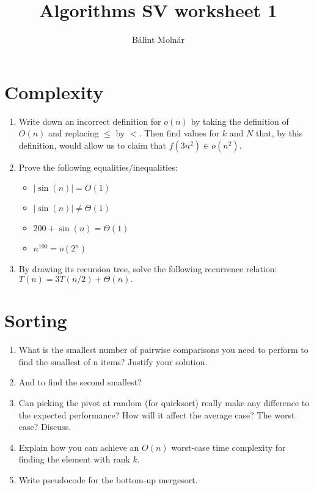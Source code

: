 \documentclass{article}
\title{{Algorithms SV worksheet 1}}
\author{Bálint Molnár}
\begin{document}
\maketitle


\section{Complexity}

\begin{enumerate}
    \item Write down an incorrect definition for $o(n)$ by taking the definition of $O(n)$ and
replacing $\leq$ by $<$. Then find values for $k$ and $N$ that, by this definition, would
allow us to claim that $f (3n^2) \in o(n^2)$.

\item 
Prove the following equalities/inequalities:
\begin{itemize}
    \item $| \sin(n)| = O(1)$
    \item $| \sin(n)| \neq  \Theta(1)$
    \item $ 200 + \sin(n) =  \Theta(1)$
    \item $n^{100} = o(2^n)$
\end{itemize}
\item 
By drawing its recursion tree, solve the following recurrence relation: $T(n)=3T(n/2)+\Theta(n).$

\end{enumerate}

\section{Sorting}

\begin{enumerate}
    \item What is the smallest number of pairwise comparisons you need to perform to
find the smallest of n items? Justify your solution.
\item And to find the second smallest?
\item Can picking the pivot at random (for quicksort) really make any difference to the
expected performance? How will it affect the average case? The
worst case? Discuss.

\item Explain how you can achieve an $O(n)$ worst-case time complexity for finding the element with rank $k$.
\item Write pseudocode for the bottom-up mergesort.
\end{enumerate}
\end{document}
